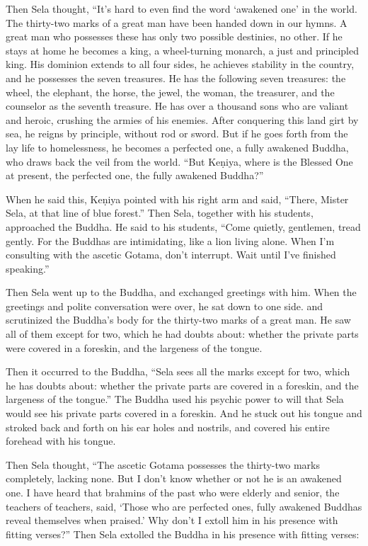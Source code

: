 \documentclass[12pt,openany]{book}%
\begin{document}
Then Sela thought, “It’s hard to even find the word ‘awakened one’ in the world. The thirty-two marks of a great man have been handed down in our hymns. A great man who possesses these has only two possible destinies, no other. If he stays at home he becomes a king, a wheel-turning monarch, a just and principled king. His dominion extends to all four sides, he achieves stability in the country, and he possesses the seven treasures. He has the following seven treasures: the wheel, the elephant, the horse, the jewel, the woman, the treasurer, and the counselor as the seventh treasure. He has over a thousand sons who are valiant and heroic, crushing the armies of his enemies. After conquering this land girt by sea, he reigns by principle, without rod or sword. But if he goes forth from the lay life to homelessness, he becomes a perfected one, a fully awakened Buddha, who draws back the veil from the world. “But \textsanskrit{Keṇiya}, where is the Blessed One at present, the perfected one, the fully awakened Buddha?” 

When he said this, \textsanskrit{Keṇiya} pointed with his right arm and said, “There, Mister Sela, at that line of blue forest.” Then Sela, together with his students, approached the Buddha. He said to his students, “Come quietly, gentlemen, tread gently. For the Buddhas are intimidating, like a lion living alone. When I’m consulting with the ascetic Gotama, don’t interrupt. Wait until I’ve finished speaking.” 

Then Sela went up to the Buddha, and exchanged greetings with him. When the greetings and polite conversation were over, he sat down to one side. and scrutinized the Buddha’s body for the thirty-two marks of a great man. He saw all of them except for two, which he had doubts about: whether the private parts were covered in a foreskin, and the largeness of the tongue. 

Then it occurred to the Buddha, “Sela sees all the marks except for two, which he has doubts about: whether the private parts are covered in a foreskin, and the largeness of the tongue.” The Buddha used his psychic power to will that Sela would see his private parts covered in a foreskin. And he stuck out his tongue and stroked back and forth on his ear holes and nostrils, and covered his entire forehead with his tongue. 

Then Sela thought, “The ascetic Gotama possesses the thirty-two marks completely, lacking none. But I don’t know whether or not he is an awakened one. I have heard that brahmins of the past who were elderly and senior, the teachers of teachers, said, ‘Those who are perfected ones, fully awakened Buddhas reveal themselves when praised.’ Why don’t I extoll him in his presence with fitting verses?” Then Sela extolled the Buddha in his presence with fitting verses: 
\end{document}
